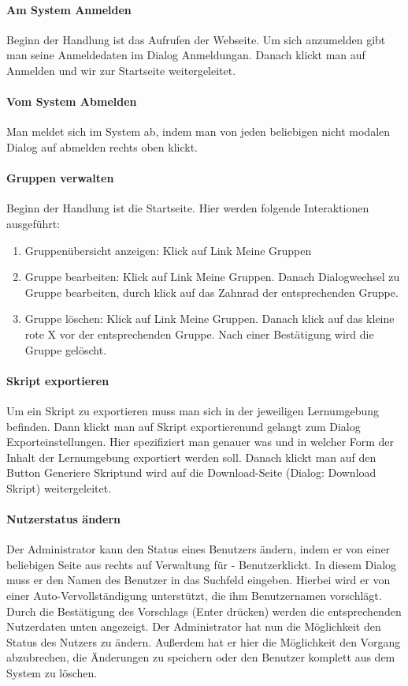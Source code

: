 \documentclass[12pt,a4paper]{article}
\begin{document}
{\paragraph{Am System Anmelden}
Beginn der Handlung ist das Aufrufen der Webseite. Um sich anzumelden gibt man seine Anmeldedaten im Dialog \glqq Anmeldung\grqq  an. Danach klickt man auf Anmelden und wir zur Startseite weitergeleitet.

\paragraph{Vom System Abmelden}
Man meldet sich im System ab, indem man von jeden beliebigen nicht modalen Dialog auf abmelden rechts oben klickt.

\paragraph{Gruppen verwalten}
Beginn der Handlung ist die Startseite. Hier werden folgende Interaktionen ausgeführt:
\begin{enumerate}
	\item \glqq Gruppenübersicht anzeigen\grqq: Klick auf Link \glqq Meine Gruppen\grqq
	\item \glqq Gruppe bearbeiten\grqq: Klick auf Link \glqq Meine Gruppen\grqq . Danach Dialogwechsel zu  \glqq Gruppe bearbeiten\grqq, durch klick auf das Zahnrad der entsprechenden Gruppe.
	\item \glqq Gruppe löschen\grqq: Klick auf Link \glqq Meine Gruppen\grqq . Danach klick auf das kleine rote X vor der entsprechenden Gruppe. Nach einer Bestätigung wird die Gruppe gelöscht.
\end{enumerate}

\paragraph{Skript exportieren}
Um ein Skript zu exportieren muss man sich in der jeweiligen Lernumgebung befinden. Dann klickt man auf \glqq Skript exportieren\grqq  und gelangt zum Dialog \glqq  Exporteinstellungen\grqq. Hier spezifiziert man genauer was und in welcher Form der Inhalt der Lernumgebung exportiert werden soll. Danach klickt man auf den Button \glqq Generiere Skript\grqq und wird auf die Download-Seite (Dialog: \glqq Download Skript\grqq ) weitergeleitet.

\paragraph{Nutzerstatus ändern}
Der Administrator kann den Status eines Benutzers ändern, indem er von einer beliebigen Seite aus rechts auf \glqq Verwaltung für - Benutzer\grqq klickt. In diesem Dialog muss er den Namen des Benutzer in das Suchfeld eingeben. Hierbei wird er von einer Auto-Vervollständigung unterstützt, die ihm Benutzernamen vorschlägt. Durch die Bestätigung des Vorschlags (Enter drücken) werden die entsprechenden Nutzerdaten unten angezeigt. Der Administrator hat nun die Möglichkeit den Status des Nutzers zu ändern.
Außerdem hat er hier die Möglichkeit den Vorgang abzubrechen, die Änderungen zu speichern oder den Benutzer komplett aus dem System zu löschen.

}
\end{document}
